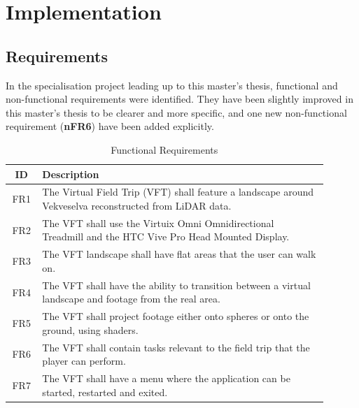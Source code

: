 \chapter{Implementation}
\label{chap:implementation}

\section{Requirements}
    In the specialisation project leading up to this master's thesis, functional and non-functional requirements were identified. They have been slightly improved in this master's thesis to be clearer and more specific, and one new non-functional requirement (\textbf{nFR6}) have been added explicitly.
    
    \FloatBarrier
    \begin{table}
    \label{tab:fr}
    \caption{Functional Requirements}
    \begin{tabular}{ | c | p{0.9\linewidth} | }
        \hline
        \textbf{ID} & \textbf{Description} \\
        \hline
        FR1 & The Virtual Field Trip (VFT) shall feature a landscape around Vekveselva reconstructed from LiDAR data. \\
        FR2 & The VFT shall use the Virtuix Omni Omnidirectional Treadmill and the HTC Vive Pro Head Mounted Display. \\
        FR3 & The VFT landscape shall have flat areas that the user can walk on.\\
        FR4 & The VFT shall have the ability to transition between a virtual landscape and footage from the real area. \\
        FR5 & The VFT shall project footage either onto spheres or onto the ground, using shaders. \\
        FR6 & The VFT shall contain tasks relevant to the field trip that the player can perform. \\
        FR7 & The VFT shall have a menu where the application can be started, restarted and exited. \\
        \hline
    \end{tabular}
    \end{table}
    \FloatBarrier
    
